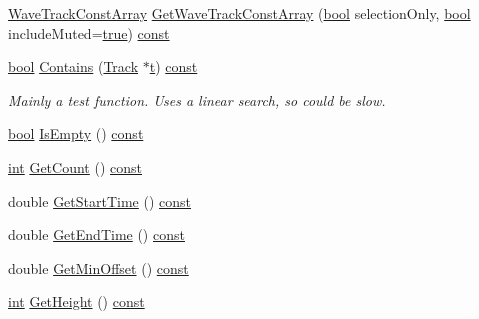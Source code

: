 \begin{DoxyCompactItemize}
\item 
\hyperlink{class_wave_track_const_array}{Wave\+Track\+Const\+Array} \hyperlink{class_track_list_a91c5f50a0294ba72528f1396fc0f922f}{Get\+Wave\+Track\+Const\+Array} (\hyperlink{mac_2config_2i386_2lib-src_2libsoxr_2soxr-config_8h_abb452686968e48b67397da5f97445f5b}{bool} selection\+Only, \hyperlink{mac_2config_2i386_2lib-src_2libsoxr_2soxr-config_8h_abb452686968e48b67397da5f97445f5b}{bool} include\+Muted=\hyperlink{mac_2config_2i386_2lib-src_2libsoxr_2soxr-config_8h_a41f9c5fb8b08eb5dc3edce4dcb37fee7}{true}) \hyperlink{getopt1_8c_a2c212835823e3c54a8ab6d95c652660e}{const} 
\item 
\hyperlink{mac_2config_2i386_2lib-src_2libsoxr_2soxr-config_8h_abb452686968e48b67397da5f97445f5b}{bool} \hyperlink{class_track_list_aefa8c55074ae7681638b282cb4d11d0c}{Contains} (\hyperlink{class_track}{Track} $\ast$\hyperlink{octave__test_8m_aaccc9105df5383111407fd5b41255e23}{t}) \hyperlink{getopt1_8c_a2c212835823e3c54a8ab6d95c652660e}{const} 
\begin{DoxyCompactList}\small\item\em Mainly a test function. Uses a linear search, so could be slow. \end{DoxyCompactList}\item 
\hyperlink{mac_2config_2i386_2lib-src_2libsoxr_2soxr-config_8h_abb452686968e48b67397da5f97445f5b}{bool} \hyperlink{class_track_list_a493bcaaad93c4b0c3468d6b33737eaa0}{Is\+Empty} () \hyperlink{getopt1_8c_a2c212835823e3c54a8ab6d95c652660e}{const} 
\item 
\hyperlink{xmltok_8h_a5a0d4a5641ce434f1d23533f2b2e6653}{int} \hyperlink{class_track_list_a5546954aed4d89c852d592c6f911a8cb}{Get\+Count} () \hyperlink{getopt1_8c_a2c212835823e3c54a8ab6d95c652660e}{const} 
\item 
double \hyperlink{class_track_list_af5e21bb6b08a8ccc2e14e1aec3ad80e2}{Get\+Start\+Time} () \hyperlink{getopt1_8c_a2c212835823e3c54a8ab6d95c652660e}{const} 
\item 
double \hyperlink{class_track_list_a363c0208ea73546e90ca49887cefc5a8}{Get\+End\+Time} () \hyperlink{getopt1_8c_a2c212835823e3c54a8ab6d95c652660e}{const} 
\item 
double \hyperlink{class_track_list_ad7f4a421501db5f9ad4268f7ce8755f8}{Get\+Min\+Offset} () \hyperlink{getopt1_8c_a2c212835823e3c54a8ab6d95c652660e}{const} 
\item 
\hyperlink{xmltok_8h_a5a0d4a5641ce434f1d23533f2b2e6653}{int} \hyperlink{class_track_list_a75f5271a032be1258bbed94444fe6207}{Get\+Height} () \hyperlink{getopt1_8c_a2c212835823e3c54a8ab6d95c652660e}{const} 
\end{DoxyCompactItemize}
